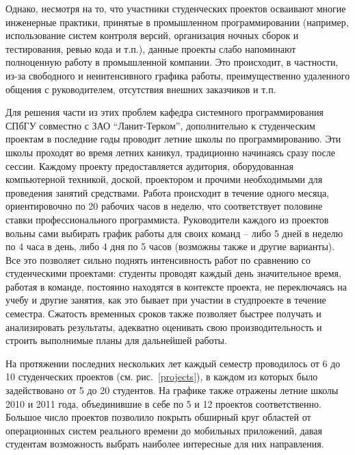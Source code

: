 \documentclass[a5paper]{article}
\begin{document}
Однако, несмотря на то, что участники студенческих проектов осваивают многие инженерные практики, принятые в промышленном программировании (например, использование систем контроля версий, организация ночных сборок и тестирования, ревью кода и т.п.), данные проекты слабо напоминают полноценную работу в промышленной компании. Это происходит, в частности, из-за свободного и неинтенсивного графика работы, преимущественно удаленного общения с руководителем, отсутствия внешних заказчиков и т.п.

Для решения части из этих проблем кафедра системного программирования СПбГУ совместно с ЗАО ``Ланит-Терком'', дополнительно к студенческим проектам в последние годы проводит летние школы по программированию. Эти школы проходят во время летних каникул, традиционно начинаясь сразу после сессии. Каждому проекту предоставляется аудитория, оборудованная компьютерной техникой, доской, проектором и прочими необходимыми для проведения занятий средствами. Работа происходит в течение одного месяца, ориентировочно по 20 рабочих часов в неделю, что соответствует половине ставки профессионального программиста. Руководители каждого из проектов вольны сами выбирать график работы для своих команд --  либо 5 дней в неделю по 4 часа в день, либо 4 дня по 5 часов (возможны также и другие варианты). Все это позволяет сильно поднять интенсивность работ по сравнению со студенческими проектами: студенты проводят каждый день значительное время, работая в команде, постоянно находятся в контексте проекта, не переключаясь на учебу и другие занятия, как это бывает при участии в студпроекте в течение семестра. Сжатость временных сроков также позволяет быстрее получать и анализировать результаты, адекватно оценивать свою производительность и строить выполнимые планы для дальнейшей работы. 

На протяжении последних нескольких лет каждый семестр проводилось от 6 до 10 студенческих проектов (см. рис.~\ref{projects}), в каждом из которых было задействовано от 5 до 20 студентов. На графике также отражены летние школы 2010 и 2011 года, объединившие в себе по 5 и 12 проектов соответственно. Большое число проектов позволило покрыть обширный круг областей от операционных систем реального времени до мобильных приложений, давая студентам возможность выбрать наиболее интересные для них направления.
\end{document}
